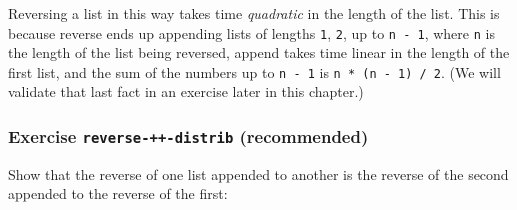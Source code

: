 \begin{fence}
\begin{code}
\>[2][@{}l@{\AgdaIndent{0}}]%
\>[4]\AgdaSpace{}%
\AgdaSpace{}%
\AgdaSpace{}%
\AgdaSpace{}%
\AgdaSymbol{(}\AgdaInductiveConstructor{[]}\AgdaSpace{}%
\AgdaOperator{\AgdaFunction{++}}\AgdaSpace{}%
\AgdaSpace{}%
\AgdaSpace{}%
\AgdaInductiveConstructor{[]}\AgdaSymbol{)}\<%
\\
%
\>[2]\<%
\\
\>[2][@{}l@{\AgdaIndent{0}}]%
\>[4]\AgdaSpace{}%
\AgdaSpace{}%
\AgdaSpace{}%
\AgdaSpace{}%
\AgdaSpace{}%
\AgdaSpace{}%
\AgdaInductiveConstructor{[]}\<%
\\
%
\>[2]\<%
\\
\>[2][@{}l@{\AgdaIndent{0}}]%
\>[4]\AgdaOperator{\AgdaInductiveConstructor{[}}\AgdaSpace{}%
\AgdaSpace{}%
\AgdaOperator{\AgdaInductiveConstructor{,}}\AgdaSpace{}%
\AgdaSpace{}%
\AgdaOperator{\AgdaInductiveConstructor{,}}\AgdaSpace{}%
\AgdaSpace{}%
\AgdaOperator{\AgdaInductiveConstructor{]}}\<%
\\
%
\>[2]\<%
\end{code}
\end{fence}

Reversing a list in this way takes time \emph{quadratic} in the length
of the list. This is because reverse ends up appending lists of lengths
\texttt{1}, \texttt{2}, up to \texttt{n\ -\ 1}, where \texttt{n} is the
length of the list being reversed, append takes time linear in the
length of the first list, and the sum of the numbers up to
\texttt{n\ -\ 1} is \texttt{n\ *\ (n\ -\ 1)\ /\ 2}. (We will validate
that last fact in an exercise later in this chapter.)

\hypertarget{exercise-reverse--distrib-recommended}{%
\subsubsection{\texorpdfstring{Exercise \texttt{reverse-++-distrib}
(recommended)}{Exercise reverse-++-distrib (recommended)}}\label{exercise-reverse--distrib-recommended}}

Show that the reverse of one list appended to another is the reverse of
the second appended to the reverse of the first:

